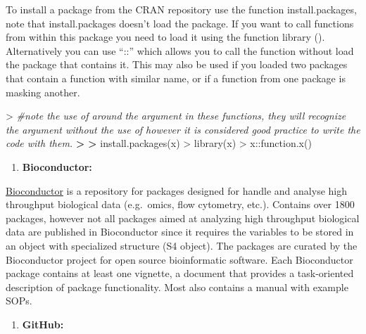 \documentclass[
]{book}
\newenvironment{Shaded}{\begin{snugshade}}{\end{snugshade}}
\newcommand{\CommentTok}[1]{\textcolor[rgb]{0.56,0.35,0.01}{\textit{#1}}}
\newcommand{\ErrorTok}[1]{\textcolor[rgb]{0.64,0.00,0.00}{\textbf{#1}}}
\newcommand{\FunctionTok}[1]{\textcolor[rgb]{0.00,0.00,0.00}{#1}}
\newcommand{\NormalTok}[1]{#1}
\newcommand{\SpecialCharTok}[1]{\textcolor[rgb]{0.00,0.00,0.00}{#1}}
\newcommand{\StringTok}[1]{\textcolor[rgb]{0.31,0.60,0.02}{#1}}
\providecommand{\tightlist}{%
  \setlength{\itemsep}{0pt}\setlength{\parskip}{0pt}}
\theoremstyle{definition}
\theoremstyle{definition}
\theoremstyle{definition}
\theoremstyle{definition}
\theoremstyle{remark}
\begin{document}
To install a package from the CRAN repository use the function install.packages, note that install.packages doesn't load
the package. If you want to call functions from within this package you need to load it using the function library ().
Alternatively you can use ``::'' which allows you to call the function without load the package that contains it. This may
also be used if you loaded two packages that contain a function with similar name, or if a function from one package is
masking another.

\begin{Shaded}
\begin{Highlighting}[]
\SpecialCharTok{\textgreater{}} \CommentTok{\#note the use of \textquotesingle{}\textquotesingle{} around the argument in these functions, they will recognize the argument without the use of \textquotesingle{} \textquotesingle{} however it is considered good practice to write the code with them.}
\ErrorTok{\textgreater{}} 
\ErrorTok{\textgreater{}} \FunctionTok{install.packages}\NormalTok{(}\StringTok{\textquotesingle{}x\textquotesingle{}}\NormalTok{)}
\SpecialCharTok{\textgreater{}} \FunctionTok{library}\NormalTok{(}\StringTok{\textquotesingle{}x\textquotesingle{}}\NormalTok{)}
\SpecialCharTok{\textgreater{}}\NormalTok{ x}\SpecialCharTok{::}\FunctionTok{function.x}\NormalTok{()}
\end{Highlighting}
\end{Shaded}

\begin{enumerate}
\def\labelenumi{\arabic{enumi}.}
\setcounter{enumi}{1}
\tightlist
\item
  \textbf{Bioconductor:}
\end{enumerate}

\href{http://www.bioconductor.org/}{Bioconductor} is a repository for packages designed for handle and analyse high throughput
biological data (e.g.~omics, flow cytometry, etc.). Contains over 1800 packages, however not all packages aimed at
analyzing high throughput biological data are published in Bioconductor since it requires the variables to be stored in an
object with specialized structure (S4 object). The packages are curated by the Bioconductor project for open source
bioinformatic software. Each Bioconductor package contains at least one vignette, a document that provides a task-oriented
description of package functionality. Most also contains a manual with example SOPs.

\begin{enumerate}
\def\labelenumi{\arabic{enumi}.}
\setcounter{enumi}{2}
\tightlist
\item
  \textbf{GitHub:}
\end{enumerate}
\end{document}
